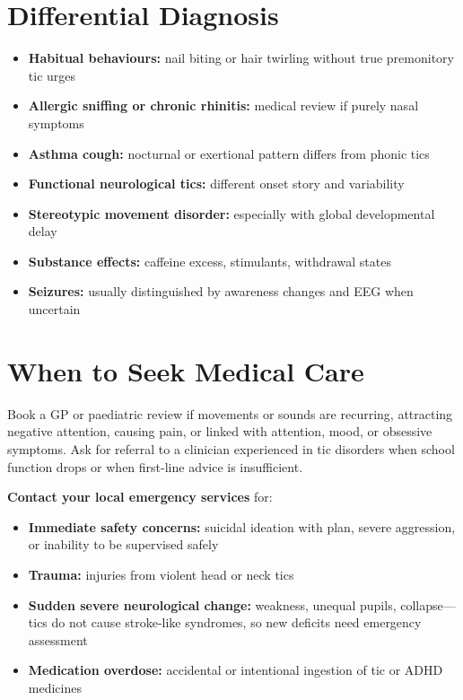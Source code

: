\section*{Differential Diagnosis}
\begin{itemize}
    \item \textbf{Habitual behaviours:} nail biting or hair twirling without true premonitory tic urges
    \item \textbf{Allergic sniffing or chronic rhinitis:} medical review if purely nasal symptoms
    \item \textbf{Asthma cough:} nocturnal or exertional pattern differs from phonic tics
    \item \textbf{Functional neurological tics:} different onset story and variability
    \item \textbf{Stereotypic movement disorder:} especially with global developmental delay
    \item \textbf{Substance effects:} caffeine excess, stimulants, withdrawal states
    \item \textbf{Seizures:} usually distinguished by awareness changes and EEG when uncertain
\end{itemize}

\section*{When to Seek Medical Care}
Book a GP or paediatric review if movements or sounds are recurring, attracting negative attention, causing pain, or linked with attention, mood, or obsessive symptoms. Ask for referral to a clinician experienced in tic disorders when school function drops or when first-line advice is insufficient.

\textbf{Contact your local emergency services} for:
\begin{itemize}
    \item \textbf{Immediate safety concerns:} suicidal ideation with plan, severe aggression, or inability to be supervised safely
    \item \textbf{Trauma:} injuries from violent head or neck tics
    \item \textbf{Sudden severe neurological change:} weakness, unequal pupils, collapse---tics do not cause stroke-like syndromes, so new deficits need emergency assessment
    \item \textbf{Medication overdose:} accidental or intentional ingestion of tic or ADHD medicines
\end{itemize}

